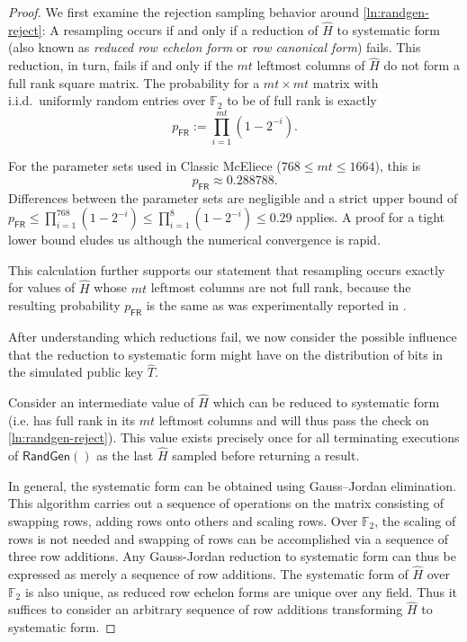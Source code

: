 \begin{proof}
    We first examine the rejection sampling behavior around \cref{ln:randgen-reject}: A resampling occurs if and only if a reduction of $\hat H$ to systematic form (also known as \emph{reduced row echelon form} or \emph{row canonical form}) fails. This reduction, in turn, fails if and only if the $mt$ leftmost columns of $\hat H$ do not form a full rank square matrix.
    The probability for a $mt \times mt$ matrix with i.i.d.~uniformly random entries over $\mathbb F_2$ to be of full rank is exactly~\cite{DBLP:journals/corr/SalmondGGC14}
    \[ p_\mathsf{FR} := \prod_{i=1}^{mt} \left( 1-2^{-i} \right). \]
    
    For the parameter sets used in Classic McEliece ($768 \leq mt \leq 1664$), this is \[ p_\mathsf{FR} \approx 0.288788 . \]
    Differences between the parameter sets are negligible and a strict upper bound of $p_\mathsf{FR} \leq \prod_{i=1}^{768} \left( 1-2^{-i} \right) \leq \prod_{i=1}^{8} \left( 1-2^{-i} \right) \leq 0.29$ applies. A proof for a tight lower bound eludes us although the numerical convergence is rapid.
    
    This calculation further supports our statement that resampling occurs exactly for values of $\hat H$ whose $mt$ leftmost columns are not full rank, because the resulting probability $p_\mathsf{FR}$ is the same as was experimentally reported in \cite[security.pdf:~Section~4.2]{NISTPQC-R4:ClassicMcEliece22}.
    
    After understanding which reductions fail, we now consider the possible influence that the reduction to systematic form might have on the distribution of bits in the simulated public key $\hat T$.

    Consider an intermediate value of $\hat H$ which can be reduced to systematic form (i.e. has full rank in its $mt$ leftmost columns and will thus pass the check on \cref{ln:randgen-reject}). This value exists precisely once for all terminating executions of $\mathsf{RandGen}()$ as the last $\hat H$ sampled before returning a result.

    In general, the systematic form can be obtained using Gauss–Jordan elimination. This algorithm carries out a sequence of operations on the matrix consisting of swapping rows, adding rows onto others and scaling rows.
    Over $\mathbb F_2$, the scaling of rows is not needed and swapping of rows can be accomplished via a sequence of three row additions. Any Gauss-Jordan reduction to systematic form can thus be expressed as merely a sequence of row additions.
    The systematic form of $\hat H$ over $\mathbb F_2$ is also unique, as reduced row echelon forms are unique over any field. Thus it suffices to consider an arbitrary sequence of row additions transforming $\hat H$ to systematic form.


\end{proof}
